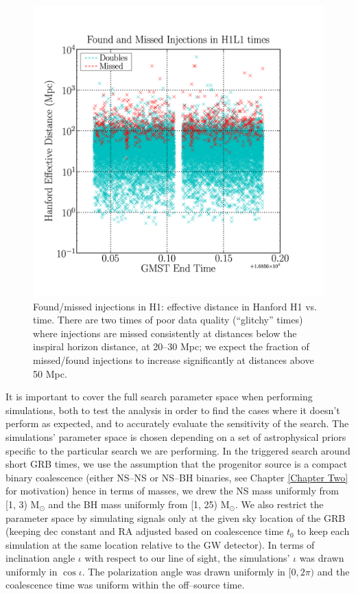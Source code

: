 \begin{figure}[ht!]
\centering
\includegraphics[scale=0.35]{Images/070429B_missed_time.png}
\caption{Found/missed injections in H1: effective distance in Hanford H1 vs. time. There are two times of poor data quality (``glitchy'' times) where injections are missed consistently at distances below the inspiral horizon distance, at 20--30 Mpc; we expect the fraction of missed/found injections to increase significantly at distances above 50 Mpc.}
\label{injectionstimeH1}
\end{figure}

It is important to cover the full search parameter space when performing simulations, both to test the analysis in order to find the cases where it doesn't perform as expected, and to accurately evaluate the sensitivity of the search. The simulations' parameter space is chosen depending on a set of astrophysical priors specific to the particular search we are performing. In the triggered search around short GRB times, we use the assumption that the progenitor source is a compact binary coalescence (either NS--NS or NS--BH binaries, see Chapter \ref{Chapter Two} for motivation) hence in terms of masses, we drew the NS mass uniformly from [1, 3) $\mathrm{M}_{\odot}$ and the BH mass uniformly from [1, 25) $\mathrm{M}_{\odot}$. We also restrict the parameter space by simulating signals only at the given sky location of the GRB (keeping dec constant and RA adjusted based on coalescence time $t_0$ to keep each simulation at the same location relative to the GW detector). In terms of inclination angle $\iota$ with respect to our line of sight, the simulations' $\iota$ was drawn uniformly in $\cos \iota$. The polarization angle was drawn uniformly in $[0,2\pi)$ and the coalescence time was uniform within the off--source time.

